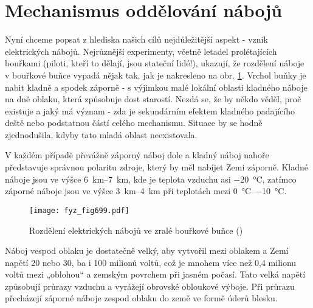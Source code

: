   \section{Mechanismus oddělování nábojů}\label{fyz:IIchapIXsecV} 
    Nyní chceme popsat z hlediska našich cílů nejdůležitější aspekt - vznik elektrických nábojů.
    Nejrůznější experimenty, včetně letadel prolétajících bouřkami (piloti, kteří to dělají, jsou
    stateční lidé!), ukazují, že rozdělení náboje v bouřkové buňce vypadá nějak tak, jak je
    nakresleno na obr. \ref{fyz:fig699}. Vrchol buňky je nabit kladně a spodek záporně - s výjimkou
    malé lokální oblasti kladného náboje na dně oblaku, která způsobuje dost starostí. Nezdá se, že
    by někdo věděl, proč existuje a jaký má význam - zda je sekundárním efektem kladného padajícího
    deště nebo podstatnou částí celého mechanismu. Situace by se hodně zjednodušila, kdyby tato
    mladá oblast neexistovala.

    V každém případě převážně záporný náboj dole a kladný náboj nahoře představuje správnou polaritu
    zdroje, který by měl nabíjet Zemi záporně. Kladné náboje jsou ve výšce \SIrange{6}{7}{\km}, kde
    je teplota vzduchu asi \SI{-20}{\degreeCelsius}, zatímco záporné náboje jsou ve výšce
    \SIrange{3}{4}{\km} při teplotách mezi \SIrange{0}{-10}{\degreeCelsius}.

    \begin{figure}[ht!] %
      \centering
      \texttt{[image: fyz\_fig699.pdf]}
      \caption{Rozdělení elektrických nábojů ve zralé bouřkové buňce (\cite[s.~707]{Feynman02})}
      \label{fyz:fig699}
    \end{figure}

    Náboj vespod oblaku je dostatečně velký, aby vytvořil mezi oblakem a Zemí napětí 20 nebo 30, ba
    i 100 milionů voltů, což je mnohem více než 0,4 milionu voltů mezi „oblohou“ a zemským povrchem
    při jasném počasí. Tato velká napětí způsobují průrazy vzduchu a vyrážejí obrovské obloukové
    výboje. Při průrazu přecházejí záporné náboje zespod oblaku do země ve formě úderů blesku.

